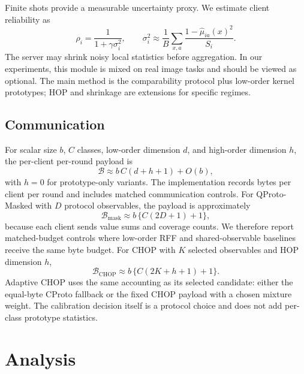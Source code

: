 \documentclass[preprint]{elsarticle}
\newcommand{\method}{QProto}
\begin{document}
Finite shots provide a measurable uncertainty proxy. We estimate client reliability as
\begin{equation}
    \rho_i = \frac{1}{1+\gamma\sigma_i^2},
    \qquad
    \sigma_i^2 \approx
    \frac{1}{B}\sum_{x,a}\frac{1-\hat{\mu}_{ia}(x)^2}{S_i}.
\end{equation}
The server may shrink noisy local statistics before aggregation. In our experiments, this module is mixed on real image tasks and should be viewed as optional. The main method is the comparability protocol plus low-order kernel prototypes; HOP and shrinkage are extensions for specific regimes.

\subsection{Communication}

For scalar size \(b\), \(C\) classes, low-order dimension \(d\), and high-order dimension \(h\), the per-client per-round payload is
\begin{equation}
    \mathcal{B} \approx b\,C(d+h+1) + O(b),
\end{equation}
with \(h=0\) for prototype-only variants. The implementation records bytes per client per round and includes matched communication controls.
For \method{}-Masked with \(D\) protocol observables, the payload is approximately
\begin{equation}
    \mathcal{B}_{\mathrm{mask}}
    \approx b\,\{C(2D+1)+1\},
\end{equation}
because each client sends value sums and coverage counts. We therefore report matched-budget controls where low-order RFF and shared-observable baselines receive the same byte budget.
For CHOP with \(K\) selected observables and HOP dimension \(h\),
\begin{equation}
    \mathcal{B}_{\mathrm{CHOP}}
    \approx b\,\{C(2K+h+1)+1\}.
\end{equation}
Adaptive CHOP uses the same accounting as its selected candidate: either the equal-byte CProto fallback or the fixed CHOP payload with a chosen mixture weight. The calibration decision itself is a protocol choice and does not add per-class prototype statistics.

\section{Analysis}
\end{document}
